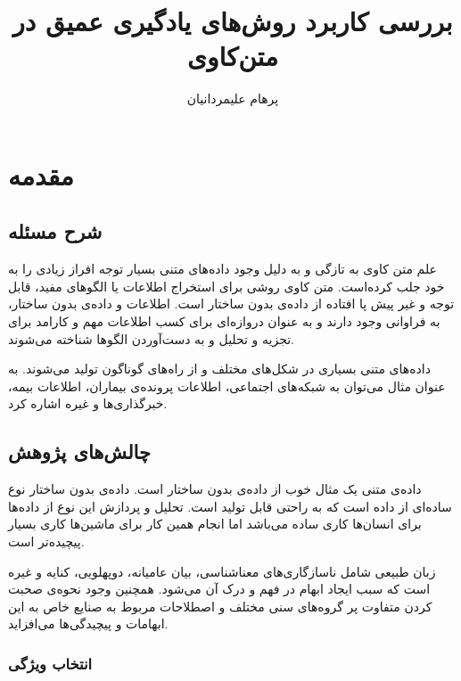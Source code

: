 \documentclass[12pt, a4paper, oneside]{report}
\title{بررسی کاربرد روش‌های یادگیری عمیق در متن‌کاوی}
\author{پرهام علیمردانیان}
\date{}
\begin{document}
\maketitle

\begin{abstract}

\end{abstract}

\tableofcontents
\listoffigures
\listoftables

\chapter{مقدمه}
\pagebreak
\section{شرح مسئله}

علم متن کاوی به تازگی و به دلیل وجود داده‌های متنی بسیار توجه افراز زیادی را به خود جلب کرده‌است.
متن کاوی روشی برای استخراج اطلاعات یا الگوهای مفید، قابل توجه و غیر پیش‌ پا افتاده از داده‌ی
بدون ساختار است. اطلاعات و داده‌ی بدون ساختار، به فراوانی وجود دارند و به عنوان دروازه‌ای برای کسب
اطلاعات مهم و کارامد برای تجزیه و تحلیل و به دست‌آوردن الگوها شناخته می‌شوند\cite{8844895}.

داده‌های متنی بسیاری در شکل‌های مختلف و از راه‌های گوناگون تولید می‌شوند. به عنوان مثال می‌توان به شبکه‌های اجتماعی،
اطلاعات پرونده‌ی بیماران، اطلاعات بیمه، خبرگذاری‌ها و غیره اشاره کرد\cite{DBLP:journals/corr/AllahyariPASTGK17a}.

\section{چالش‌های پژوهش}

داده‌ی متنی یک مثال خوب از داده‌ی بدون ساختار است. داده‌ی بدون ساختار نوع ساده‌ای از داده است که به راحتی قابل تولید است.
تحلیل و پردازش این نوع از داده‌ها برای انسان‌ها کاری ساده می‌باشد اما انجام همین کار برای ماشین‌ها کاری بسیار پیچیده‌تر
است. 

زبان طبیعی شامل ناسازگاری‌های معناشناسی، بیان عامیانه، دوپهلویی، کنایه و غیره است که سبب ایجاد ابهام
در فهم و درک آن می‌شود. همچنین وجود نحوه‌ی صحبت کردن متفاوت پر گروه‌های سنی مختلف و اصطلاحات
مربوط به صنایع خاص به این ابهامات و پیچیدگی‌ها می‌افزاید\cite{8844895}.

\subsection{انتخاب ویژگی}
\end{document}
